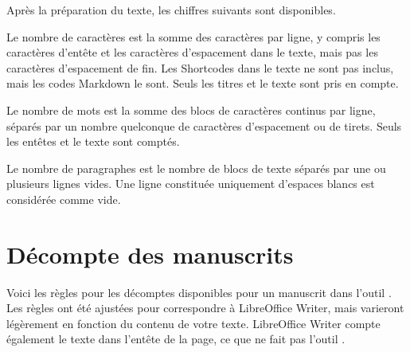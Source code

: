 \documentclass[a4paper,11pt,french]{sphinxmanual}
\begin{document}
\sphinxAtStartPar
Après la préparation du texte, les chiffres suivants sont disponibles.
\begin{description}
\sphinxAtStartPar
Le nombre de caractères est la somme des caractères par ligne, y compris les caractères d’en\sphinxhyphen{}tête et les caractères d’espacement dans le texte, mais pas les caractères d’espacement de fin. Les Shortcodes dans le texte ne sont pas inclus, mais les codes Markdown le sont. Seuls les titres et le texte sont pris en compte.

\sphinxAtStartPar
Le nombre de mots est la somme des blocs de caractères continus par ligne, séparés par un nombre quelconque de caractères d’espacement ou de tirets. Seuls les en\sphinxhyphen{}têtes et le texte sont comptés.

\sphinxAtStartPar
Le nombre de paragraphes est le nombre de blocs de texte séparés par une ou plusieurs lignes vides. Une ligne constituée uniquement d’espaces blancs est considérée comme vide.

\end{description}


\section{Décompte des manuscrits}
\label{\detokenize{more_counting:manuscript-counts}}
\sphinxAtStartPar
Voici les règles pour les décomptes disponibles pour un manuscrit dans l’outil . Les règles ont été ajustées pour correspondre à LibreOffice Writer, mais varieront légèrement en fonction du contenu de votre texte. LibreOffice Writer compte également le texte dans l’en\sphinxhyphen{}tête de la page, ce que ne fait pas l’outil .
\end{document}
